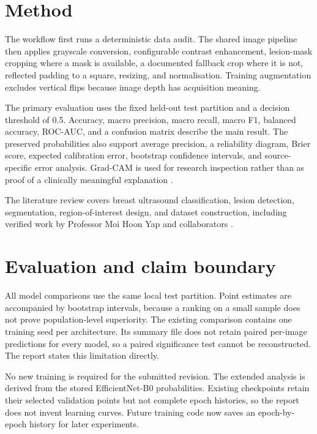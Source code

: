 \documentclass[10pt]{article}
\begin{document}
\section{Method}

The workflow first runs a deterministic data audit. The shared image pipeline then applies grayscale conversion, configurable contrast enhancement, lesion-mask cropping where a mask is available, a documented fallback crop where it is not, reflected padding to a square, resizing, and normalisation. Training augmentation excludes vertical flips because image depth has acquisition meaning.

The primary evaluation uses the fixed held-out test partition and a decision threshold of 0.5. Accuracy, macro precision, macro recall, macro F1, balanced accuracy, ROC-AUC, and a confusion matrix describe the main result. The preserved probabilities also support average precision, a reliability diagram, Brier score, expected calibration error, bootstrap confidence intervals, and source-specific error analysis. Grad-CAM is used for research inspection rather than as proof of a clinically meaningful explanation \citep{Selvaraju2017}.

The literature review covers breast ultrasound classification, lesion detection, segmentation, region-of-interest design, and dataset construction, including verified work by Professor Moi Hoon Yap and collaborators \citep{Yap2008,Yap2010,Yap2018,Yap2019,Yap2020ROI,Chen2023,Thomas2023}.

\section{Evaluation and claim boundary}

All model comparisons use the same local test partition. Point estimates are accompanied by bootstrap intervals, because a ranking on a small sample does not prove population-level superiority. The existing comparison contains one training seed per architecture. Its summary file does not retain paired per-image predictions for every model, so a paired significance test cannot be reconstructed. The report states this limitation directly.

No new training is required for the submitted revision. The extended analysis is derived from the stored EfficientNet-B0 probabilities. Existing checkpoints retain their selected validation points but not complete epoch histories, so the report does not invent learning curves. Future training code now saves an epoch-by-epoch history for later experiments.
\end{document}
